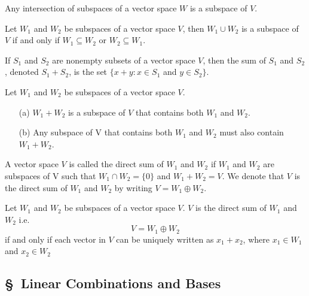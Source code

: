 


\begin{thm} %
 Any intersection of subspaces of a vector space $W$ is a subspace of $V$.
\end{thm}




\begin{thm} %
	Let $W_1$ and $W_2$ be subspaces of a vector space $V$, then $W_1 \cup W_2$ is a subspace of $V$ if and only if $W_1 \subseteq W_2$ or $W_2 \subseteq W_1$. 
\end{thm}




\begin{defn}
	If $S_1$ and $S_2$ are nonempty subsets of a vector space $V$, then the sum of $S_1$ and $S_2$, denoted $S_1 + S_2$, is the set $\{x+y:x \in S_1$ and $y\in S_2\}$.
\end{defn}

\begin{thm} %
	Let $W_1$ and $W_2$ be subspaces of a vector space $V$.
	\begin{itemize}
		\item[(a)] $W_1 + W_2$ is a subspace of $V$ that contains both $W_1$ and $W_2$.
		\item[(b)] Any subspace of V that contains both $W_1$ and $W_2$ must also contain $W_1 + W_2$. 
	\end{itemize}
\end{thm}

%


\begin{defn} A vector space $V$ is called the direct sum of $W_1$ and $W_2$ if $W_1$ and $W_2$ are subspaces of V such that $W_1 \cap W_2 = \{0\}$ and $W_1 + W_2 = V$. We denote that $V$ is the direct sum of $W_1$ and $W_2$ by writing $V = W_1 \oplus W_2$.
\end{defn}

\begin{thm} %
	Let $W_1$ and $W_2$ be subspaces of a vector space $V$. $V$ is the direct sum of $W_1$ and $W_2$ i.e. $$ V = W_1 \oplus W_2 $$ if and only if each vector in $V$ can be uniquely written as $x_1 + x_2$, where $x_1 \in W_1$ and $x_2 \in W_2$
\end{thm}




\subsection*{\S\ Linear Combinations and Bases}

